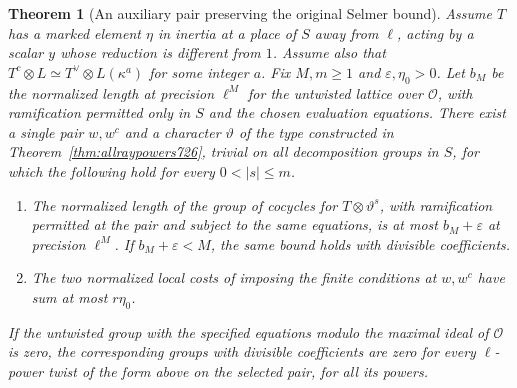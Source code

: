 \documentclass[a4paper,11pt]{article}
\newtheorem{theorem}[proposition]{Theorem}
\theoremstyle{definition}
\theoremstyle{remark}
\numberwithin{equation}{section}
\begin{document}
\begin{theorem}[An auxiliary pair preserving the original Selmer bound]
\leavevmode\label{thm:preserveselmer727}
Assume \(T\) has a marked element \(\eta\) in inertia at a place
of \(S\) away from \(\ell\), acting by a scalar \(y\) whose reduction
is different from \(1\). Assume also that
\(T^c\otimes L\simeq T^\vee\otimes L(\kappa^a)\) for some integer \(a\).
Fix \(M,m\ge1\) and \(\varepsilon,\eta_0>0\).
Let \(b_M\) be the normalized length at precision \(\ell^M\) for the
untwisted lattice over \(\mathcal O\), with ramification permitted
only in \(S\) and the chosen evaluation equations. There exist a single
pair \(w,w^c\) and a character \(\vartheta\) of the type constructed in
Theorem~\ref{thm:allraypowers726}, trivial on all decomposition groups
in \(S\), for which the following hold for every \(0<|s|\le m\).
\begin{enumerate}
\item The normalized length of the group of cocycles for
\(T\otimes\vartheta^s\), with ramification permitted at the pair and
subject to the same equations, is at most \(b_M+\varepsilon\) at
precision \(\ell^M\). If \(b_M+\varepsilon<M\), the same bound holds
with divisible coefficients.
\item The two normalized local costs of imposing the finite conditions
at \(w,w^c\) have sum at most \(r\eta_0\).
\end{enumerate}
If the untwisted group with the specified equations modulo the maximal
ideal of \(\mathcal O\) is zero, the corresponding groups with divisible
coefficients are zero for every \(\ell\)-power twist of the form above
on the selected pair, for all its powers.
\end{theorem}
\end{document}
